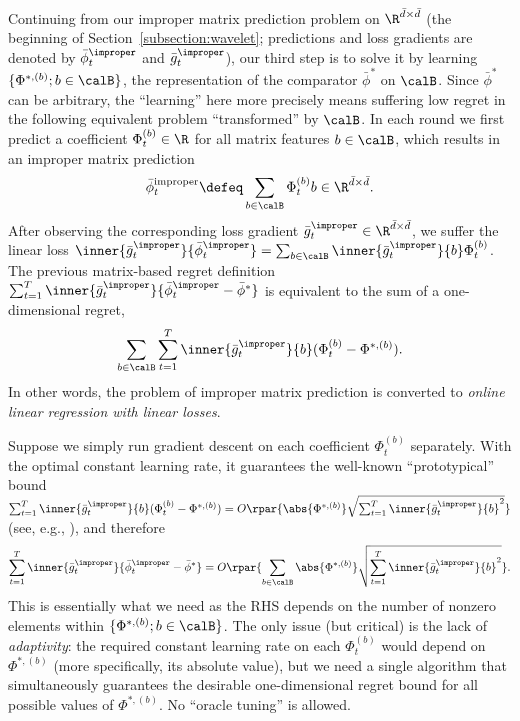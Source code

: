 \documentclass[10pt]{article}
\begin{document}
Continuing from our improper matrix prediction problem on $\R^{\bar d\times\bar d}$ (the beginning of Section~\ref{subsection:wavelet}; predictions and loss gradients are denoted by $\bar\phi^\improper_t$ and $\bar g^\improper_t$), our third step is to solve it by learning $\{\Phi^{*,(b)};b\in\calB\}$, the representation of the comparator $\bar\phi^*$ on $\calB$. Since $\bar\phi^*$ can be arbitrary, the ``learning'' here more precisely means suffering low regret in the following equivalent problem ``transformed'' by $\calB$. In each round we first predict a coefficient $\Phi_t^{(b)}\in\R$ for all matrix features $b\in\calB$, which results in an improper matrix prediction
\begin{equation}\label{eq:improper}
\bar\phi_t^{\mathrm{improper}}\defeq\sum_{b\in\calB}\Phi_t^{(b)}b\in\R^{\bar d\times\bar d}.
\end{equation}
After observing the corresponding loss gradient $\bar g_t^\improper\in\R^{\bar d\times\bar d}$, we suffer the linear loss $\inner{\bar g_t^\improper}{\bar\phi_t^\improper}=\sum_{b\in\calB}\inner{\bar g_t^\improper}{b}\Phi_t^{(b)}$. The previous matrix-based regret definition $\sum_{t=1}^T\inner{\bar g_t^\improper}{\bar \phi_t^\improper-\bar \phi^*}$ is equivalent to the sum of a one-dimensional regret,
\begin{equation*}
\sum_{b\in\calB}\sum_{t=1}^T\inner{\bar g_t^\improper}{b}(\Phi_t^{(b)}-\Phi^{*,(b)}).
\end{equation*}
In other words, the problem of improper matrix prediction is converted to \emph{online linear regression with linear losses}.

Suppose we simply run gradient descent on each coefficient $\Phi_t^{(b)}$ separately. With the optimal constant learning rate, it guarantees the well-known ``prototypical'' bound $\sum_{t=1}^T\inner{\bar g_t^\improper}{b}(\Phi_t^{(b)}-\Phi^{*,(b)})=O\rpar{\abs{\Phi^{*,(b)}}\sqrt{\sum_{t=1}^T\inner{\bar g_t^\improper}{b}^2}}$ (see, e.g., \citep[Theorem~2.13]{orabona2023modern}), and therefore
\begin{equation}\label{eq:regret_decomposition}
\sum_{t=1}^T\inner{\bar g_t^\improper}{\bar \phi^\improper_t-\bar \phi^*}=O\rpar{\sum_{b\in\calB}\abs{\Phi^{*,(b)}}\sqrt{\sum_{t=1}^T\inner{\bar g_t^\improper}{b}^2}}.
\end{equation}
This is essentially what we need as the RHS depends on the number of nonzero elements within $\{\Phi^{*,(b)};b\in\calB\}$. The only issue (but critical) is the lack of \emph{adaptivity}: the required constant learning rate on each $\Phi_t^{(b)}$ would depend on $\Phi^{*,(b)}$ (more specifically, its absolute value), but we need a single algorithm that simultaneously guarantees the desirable one-dimensional regret bound for all possible values of $\Phi^{*,(b)}$. No ``oracle tuning'' is allowed. 
\end{document}
